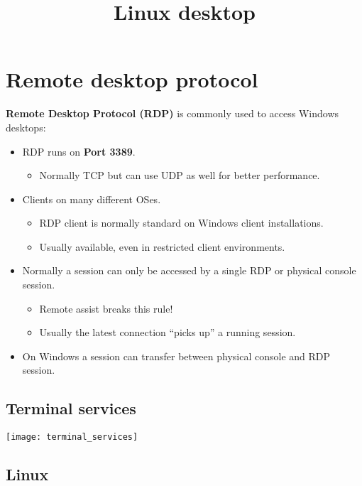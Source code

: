 \documentclass[slides]{pgnotes}
\title{Linux desktop}
\begin{document}
\maketitle

\tableofcontents

\section{Remote desktop protocol}

\textbf{Remote Desktop Protocol (RDP)} is commonly used to access Windows desktops:
\begin{itemize}
\item RDP runs on \textbf{Port 3389}.
  \begin{itemize}
  \item Normally TCP but can use UDP as well for better performance.
  \end{itemize}
\item Clients on many different OSes.
  \begin{itemize}
  \item RDP client is normally standard on Windows client installations.
  \item Usually available, even in restricted client environments.
  \end{itemize}
\item Normally a session can only be accessed by a single RDP or physical console session.
  \begin{itemize}
  \item Remote assist breaks this rule!
  \item Usually the latest connection ``picks up'' a running session.
  \end{itemize}
\item On Windows a session can transfer between physical console and RDP session.
\end{itemize}


\subsection{Terminal services}

\begin{center}
  \texttt{[image: terminal\_services]}
\end{center}



\subsection{Linux}
\end{document}
